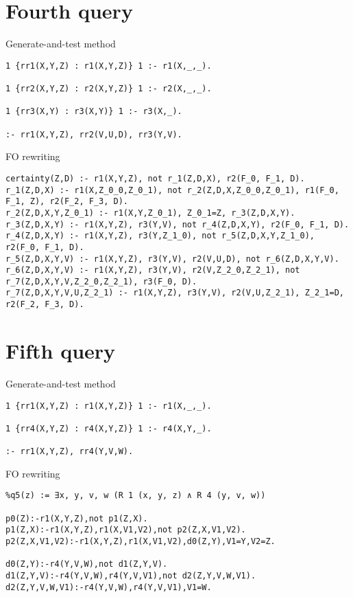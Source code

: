 
\section{Fourth query}

Generate-and-test method

\begin{verbatim}
1 {rr1(X,Y,Z) : r1(X,Y,Z)} 1 :- r1(X,_,_).

1 {rr2(X,Y,Z) : r2(X,Y,Z)} 1 :- r2(X,_,_).

1 {rr3(X,Y) : r3(X,Y)} 1 :- r3(X,_).

:- rr1(X,Y,Z), rr2(V,U,D), rr3(Y,V). 
\end{verbatim}

FO rewriting

\begin{verbatim}
certainty(Z,D) :- r1(X,Y,Z), not r_1(Z,D,X), r2(F_0, F_1, D).
r_1(Z,D,X) :- r1(X,Z_0_0,Z_0_1), not r_2(Z,D,X,Z_0_0,Z_0_1), r1(F_0, F_1, Z), r2(F_2, F_3, D).
r_2(Z,D,X,Y,Z_0_1) :- r1(X,Y,Z_0_1), Z_0_1=Z, r_3(Z,D,X,Y).
r_3(Z,D,X,Y) :- r1(X,Y,Z), r3(Y,V), not r_4(Z,D,X,Y), r2(F_0, F_1, D).
r_4(Z,D,X,Y) :- r1(X,Y,Z), r3(Y,Z_1_0), not r_5(Z,D,X,Y,Z_1_0), r2(F_0, F_1, D).
r_5(Z,D,X,Y,V) :- r1(X,Y,Z), r3(Y,V), r2(V,U,D), not r_6(Z,D,X,Y,V).
r_6(Z,D,X,Y,V) :- r1(X,Y,Z), r3(Y,V), r2(V,Z_2_0,Z_2_1), not r_7(Z,D,X,Y,V,Z_2_0,Z_2_1), r3(F_0, D).
r_7(Z,D,X,Y,V,U,Z_2_1) :- r1(X,Y,Z), r3(Y,V), r2(V,U,Z_2_1), Z_2_1=D, r2(F_2, F_3, D).
\end{verbatim}

\section{Fifth query}

Generate-and-test method

\begin{verbatim}
1 {rr1(X,Y,Z) : r1(X,Y,Z)} 1 :- r1(X,_,_).

1 {rr4(X,Y,Z) : r4(X,Y,Z)} 1 :- r4(X,Y,_).

:- rr1(X,Y,Z), rr4(Y,V,W). 
\end{verbatim}

FO rewriting

\begin{verbatim}
%q5(z) := ∃x, y, v, w (R 1 (x, y, z) ∧ R 4 (y, v, w))

p0(Z):-r1(X,Y,Z),not p1(Z,X).
p1(Z,X):-r1(X,Y,Z),r1(X,V1,V2),not p2(Z,X,V1,V2).
p2(Z,X,V1,V2):-r1(X,Y,Z),r1(X,V1,V2),d0(Z,Y),V1=Y,V2=Z.

d0(Z,Y):-r4(Y,V,W),not d1(Z,Y,V).
d1(Z,Y,V):-r4(Y,V,W),r4(Y,V,V1),not d2(Z,Y,V,W,V1).
d2(Z,Y,V,W,V1):-r4(Y,V,W),r4(Y,V,V1),V1=W.
\end{verbatim}

